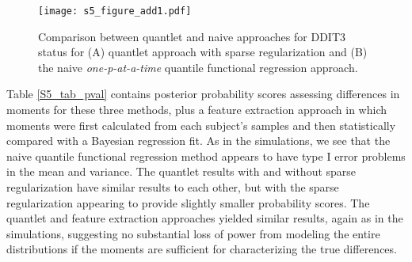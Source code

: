 \documentclass[11pt]{article}
\begin{document}
 \begin{figure}[!htb]
 \caption{Comparison between quantlet and naive approaches for DDIT3 status for (A) quantlet approach with sparse regularization and (B) the naive \textit{one-p-at-a-time} quantile functional regression approach. 	
  \label{S5_Figure_2_g}}
\centering
 \texttt{[image: s5\_figure\_add1.pdf]}
\end{figure}

    Table \ref{S5_tab_pval} contains posterior probability scores assessing differences in moments for these three methods, plus a feature extraction approach in which moments were first calculated from each subject's samples and then statistically compared with a Bayesian regression fit.
As in the simulations, we see that the naive quantile functional regression method appears to have type I error problems in the mean and variance.  The quantlet results with and without sparse regularization have similar results to each other, but with the sparse regularization appearing to provide slightly smaller probability scores.  The quantlet and feature extraction approaches yielded similar results, again as in the simulations, suggesting no substantial loss of power from modeling the entire distributions if the moments are sufficient for characterizing the true differences.
\end{document}

